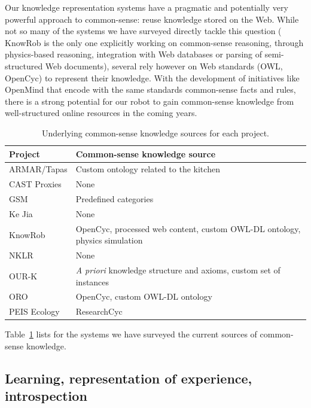 \documentclass[a4paper, twocolumn]{article}
\begin{document}
Our knowledge representation systems have a pragmatic and potentially very
powerful approach to common-sense: reuse knowledge stored on the Web. While not
so many of the systems we have surveyed directly tackle this question ({\sc
KnowRob} is the only one explicitly working on common-sense reasoning, through
physics-based reasoning, integration with Web databases or parsing of
semi-structured Web documents), several rely however on Web standards (OWL,
OpenCyc) to represent their knowledge. With the development of initiatives like
OpenMind that encode with the same standards common-sense facts and rules,
there is a strong potential for our robot to gain common-sense knowledge from
well-structured online resources in the coming years.

\begin{table}
\begin{center}

\begin{tabular}{ll}
\toprule
{\bf Project} & {\bf Common-sense knowledge source} \\
\midrule
ARMAR/{\sc Tapas} & Custom ontology related to the kitchen\\
CAST Proxies &  None \\
GSM &  Predefined categories \\
Ke Jia & None \\
{\sc KnowRob} & {\sc OpenCyc}, processed web content, custom OWL-DL ontology, physics simulation \\
NKLR &  None \\
OUR-K & {\it A priori} knowledge structure and axioms, custom set of instances\\
ORO & {\sc OpenCyc}, custom OWL-DL ontology \\
PEIS Ecology & {\sc ResearchCyc} \\

\bottomrule

\end{tabular}
\end{center}
\caption{Underlying common-sense knowledge sources for each project.}
\label{table|knowledge-sources}
\end{table}

Table~\ref{table|knowledge-sources} lists for the systems we have surveyed the
current sources of common-sense knowledge.

\subsection{Learning, representation of experience, introspection}
\end{document}
